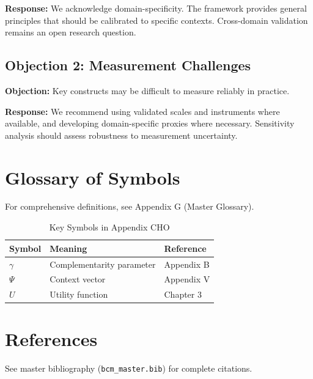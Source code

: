 \textbf{Response:} We acknowledge domain-specificity. The framework provides
general principles that should be calibrated to specific contexts. Cross-domain
validation remains an open research question.

\subsection{Objection 2: Measurement Challenges}

\textbf{Objection:} Key constructs may be difficult to measure reliably in
practice.

\textbf{Response:} We recommend using validated scales and instruments where
available, and developing domain-specific proxies where necessary. Sensitivity
analysis should assess robustness to measurement uncertainty.



\section{Glossary of Symbols}
\label{sec:cho-glossary}

For comprehensive definitions, see Appendix G (Master Glossary).

\begin{table}[htbp]
\centering
\caption{Key Symbols in Appendix CHO}
\begin{tabular}{lll}
\toprule
\textbf{Symbol} & \textbf{Meaning} & \textbf{Reference} \\
\midrule
$\gamma$ & Complementarity parameter & Appendix B \\
$\Psi$ & Context vector & Appendix V \\
$U$ & Utility function & Chapter 3 \\
\bottomrule
\end{tabular}
\end{table}


\section{References}
\label{sec:cho-references}

See master bibliography (\texttt{bcm\_master.bib}) for complete citations.

\nocite{bcm_master}



